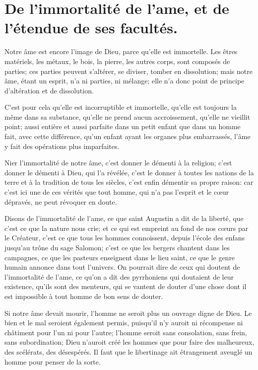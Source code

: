 \documentclass[instructions.tex]{subfiles}
\begin{document}
 
\chapter{De l’immortalité de l’ame, et de l’étendue de ses facultés.}
 
Notre âme est encore l’image de Dieu, parce qu’elle est immortelle. Les êtres matériels, les métaux, le bois, la pierre, les autres corps, sont composés de parties; ces parties peuvent s’altérer, se diviser, tomber en dissolution; mais notre âme, étant un esprit, n’a ni parties, ni mélange; elle n’a donc point de principe d’altération et de dissolution.

C’est pour cela qu’elle est incorruptible et immortelle, qu’elle est toujours la même dans sa substance, qu’elle ne prend aucun accroissement, qu’elle ne vieillit point; aussi entière et aussi parfaite dans un petit enfant que dans un homme fait, avec cette différence, qu’un enfant ayant les organes plus embarrassés, l’âme y fait des opérations plus imparfaites.

Nier l’immortalité de notre âme, c’est donner le démenti à la religion; c’est donner le démenti à Dieu, qui l’a révélée, c’est le donner à toutes les nations de la terre et à la tradition de tous les siècles, c’est enfin démentir sa propre raison: car c’est ici une de ces vérités que tout homme, qui n’a pas l’esprit et le cœur dépravés, ne peut révoquer en doute.

Disons de l’immortalité de l’ame, ce que saint Augustin a dit de la liberté, que c’est ce que la nature nous crie; et ce qui est empreint au fond de nos cœurs par le Créateur, c’est ce que tous les hommes connoissent, depuis l’école des enfans jusqu’au trône du sage Salomon; c’est ce que les bergers chantent dans les campagnes, ce que les pasteurs enseignent dans le lieu saint, ce que le genre humain annonce dans tout l’univers. On pourrait dire de ceux qui doutent de l’immortalité de l’ame, ce qu’on a dit des pyrrhoniens qui doutaient de leur existence, qu’ils sont des menteurs, qui se vantent de douter d’une chose dont il est impossible à tout homme de bon sens de douter.

Si notre âme devait mourir, l’homme ne seroit plus un ouvrage digne de Dieu. Le bien et le mal seroient également permis, puisqu’il n’y auroit ni récompense ni châtiment pour l’un ni pour l’autre; l’homme seroit sans consolation, sans frein, sans subordination; Dieu n’auroit créé les hommes que pour faire des malheureux, des scélérats, des désespérés. Il faut que le libertinage ait étrangement aveuglé un homme pour penser de la sorte.
\end{document}
